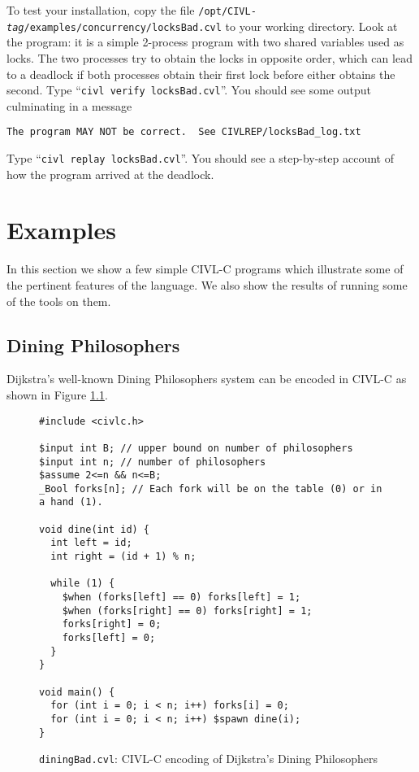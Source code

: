 To test your installation, copy the file
\texttt{/opt/CIVL-\textit{tag}/examples/concurrency/locksBad.cvl} to
your working directory.  Look at the program: it is a simple 2-process
program with two shared variables used as locks.  The two processes
try to obtain the locks in opposite order, which can lead to a
deadlock if both processes obtain their first lock before either
obtains the second.  Type ``\verb!civl verify locksBad.cvl!''.  You
should see some output culminating in a message
\begin{verbatim}
The program MAY NOT be correct.  See CIVLREP/locksBad_log.txt
\end{verbatim}

Type ``\verb!civl replay locksBad.cvl!''.  You should see a
step-by-step account of how the program arrived at the deadlock.


\chapter{Examples}

In this section we show a few simple CIVL-C programs which illustrate
some of the pertinent features of the language. We also show the results
of running some of the tools on them.

\section{Dining Philosophers}

Dijkstra's well-known Dining Philosophers system can be encoded in
CIVL-C as shown in Figure \ref{fig:dining}.

\begin{figure}[t]
  \begin{small}
\begin{verbatim}
#include <civlc.h>

$input int B; // upper bound on number of philosophers
$input int n; // number of philosophers
$assume 2<=n && n<=B;
_Bool forks[n]; // Each fork will be on the table (0) or in a hand (1). 

void dine(int id) {
  int left = id;
  int right = (id + 1) % n;

  while (1) {
    $when (forks[left] == 0) forks[left] = 1;
    $when (forks[right] == 0) forks[right] = 1;
    forks[right] = 0;
    forks[left] = 0;
  }
}

void main() {
  for (int i = 0; i < n; i++) forks[i] = 0;
  for (int i = 0; i < n; i++) $spawn dine(i);
}
\end{verbatim}
  \end{small}
  \caption{\texttt{diningBad.cvl}: CIVL-C encoding of Dijkstra's Dining Philosophers}
  \label{fig:dining}
\end{figure}

